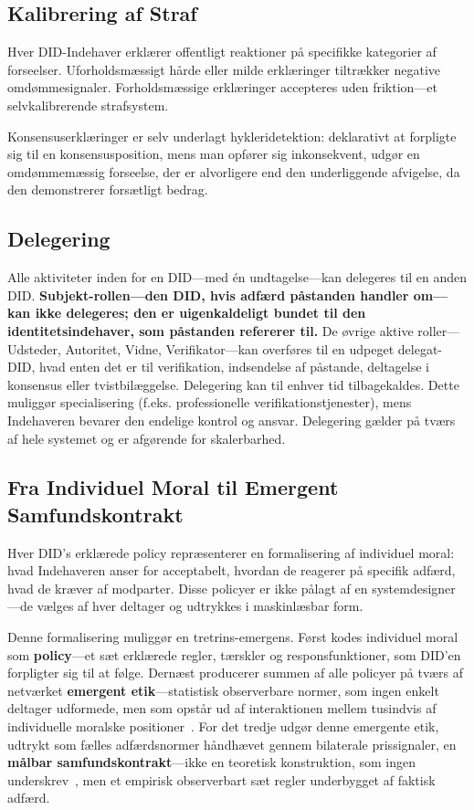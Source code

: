 \documentclass[11pt,a4paper,twocolumn]{article}
\begin{document}
\subsection{Kalibrering af Straf}

Hver DID-Indehaver erklærer offentligt reaktioner på specifikke kategorier af forseelser. Uforholdsmæssigt hårde eller milde erklæringer tiltrækker negative omdømmesignaler. Forholdsmæssige erklæringer accepteres uden friktion---et selvkalibrerende strafsystem.

Konsensuserklæringer er selv underlagt hykleridetektion: deklarativt at forpligte sig til en konsensusposition, mens man opfører sig inkonsekvent, udgør en omdømmemæssig forseelse, der er alvorligere end den underliggende afvigelse, da den demonstrerer forsætligt bedrag.

\subsection{Delegering}

Alle aktiviteter inden for en DID---med én undtagelse---kan delegeres til en anden DID. \textbf{Subjekt-rollen---den DID, hvis adfærd påstanden handler om---kan ikke delegeres; den er uigenkaldeligt bundet til den identitetsindehaver, som påstanden refererer til.} De øvrige aktive roller---Udsteder, Autoritet, Vidne, Verifikator---kan overføres til en udpeget delegat-DID, hvad enten det er til verifikation, indsendelse af påstande, deltagelse i konsensus eller tvistbilæggelse. Delegering kan til enhver tid tilbagekaldes. Dette muliggør specialisering (f.eks. professionelle verifikationstjenester), mens Indehaveren bevarer den endelige kontrol og ansvar. Delegering gælder på tværs af hele systemet og er afgørende for skalerbarhed.

\subsection{Fra Individuel Moral til Emergent Samfundskontrakt}

Hver DID's erklærede policy repræsenterer en formalisering af individuel moral: hvad Indehaveren anser for acceptabelt, hvordan de reagerer på specifik adfærd, hvad de kræver af modparter. Disse policyer er ikke pålagt af en systemdesigner---de vælges af hver deltager og udtrykkes i maskinlæsbar form.

Denne formalisering muliggør en tretrins-emergens. Først kodes individuel moral som \textbf{policy}---et sæt erklærede regler, tærskler og responsfunktioner, som DID'en forpligter sig til at følge. Dernæst producerer summen af alle policyer på tværs af netværket \textbf{emergent etik}---statistisk observerbare normer, som ingen enkelt deltager udformede, men som opstår ud af interaktionen mellem tusindvis af individuelle moralske positioner~\cite{durkheim1893}. For det tredje udgør denne emergente etik, udtrykt som fælles adfærdsnormer håndhævet gennem bilaterale prissignaler, en \textbf{målbar samfundskontrakt}---ikke en teoretisk konstruktion, som ingen underskrev~\cite{rawls1971}, men et empirisk observerbart sæt regler underbygget af faktisk adfærd.
\end{document}
